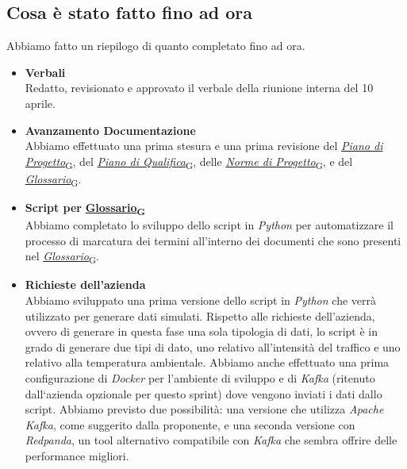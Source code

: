 \documentclass[italian,12pt]{article}
\begin{document}
\subsection{Cosa è stato fatto fino ad ora}
Abbiamo fatto un riepilogo di quanto completato fino ad ora.
\begin{itemize}
	\item \textbf{Verbali} \\
	Redatto, revisionato e approvato il verbale della riunione interna del 10 aprile.
	\item \textbf{Avanzamento Documentazione} \\
	Abbiamo effettuato una prima stesura e una prima revisione del \href{https://7last.github.io/docs/rtb/documentazione-interna/glossario#piano-di-progetto}{\textit{Piano di Progetto}\textsubscript{G}}, del \href{https://7last.github.io/docs/rtb/documentazione-interna/glossario#piano-di-qualifica}{\textit{Piano di Qualifica}\textsubscript{G}}, delle \href{https://7last.github.io/docs/rtb/documentazione-interna/glossario#norme-di-progetto}{\textit{Norme di Progetto}\textsubscript{G}}, e del \href{https://7last.github.io/docs/rtb/documentazione-interna/glossario#glossario}{\textit{Glossario}\textsubscript{G}}.
	\item \textbf{Script per} \href{https://7last.github.io/docs/rtb/documentazione-interna/glossario#glossario}{\textbf{Glossario\textsubscript{G}}} \\
	Abbiamo completato lo sviluppo dello script in \textit{Python} per automatizzare il processo di marcatura dei termini all'interno dei documenti che sono presenti nel \href{https://7last.github.io/docs/rtb/documentazione-interna/glossario#glossario}{\textit{Glossario}\textsubscript{G}}.
	\item \textbf{Richieste dell'azienda} \\
	Abbiamo sviluppato una prima versione dello script in \textit{Python} che verrà utilizzato per generare dati simulati. Rispetto alle richieste dell'azienda, ovvero di generare in questa fase una sola tipologia di dati, lo script è in grado di generare due tipi di dato, uno relativo all'intensità del traffico e uno relativo alla temperatura ambientale. Abbiamo anche effettuato una prima configurazione di \textit{Docker} per l'ambiente di sviluppo e di \textit{Kafka} (ritenuto dall`azienda opzionale per questo sprint) dove vengono inviati i dati dallo script. Abbiamo previsto due possibilità: una versione che utilizza \textit{Apache Kafka}, come suggerito dalla proponente, e una seconda versione con \textit{Redpanda}, un tool alternativo compatibile con \textit{Kafka} che sembra offrire delle performance migliori.
\end{itemize}
\end{document}

